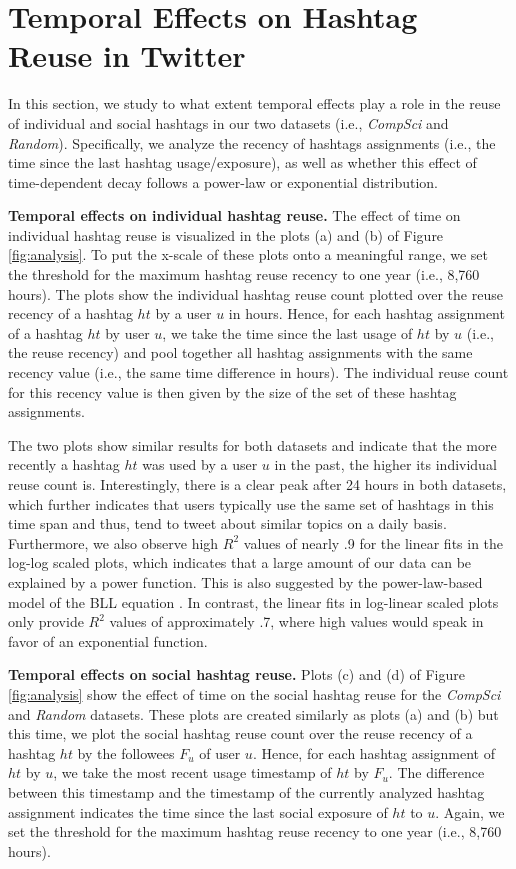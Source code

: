 \documentclass{sig-alternate-05-2015}
\newcommand{\para}[1]{\vspace{2mm}\noindent\textbf{#1}}
\begin{document}
\section{Temporal Effects on Hashtag\\Reuse in Twitter} \label{sec:analysis}
In this section, we study to what extent temporal effects play a role in the reuse of individual and social hashtags in our two datasets (i.e., \textit{CompSci}{} and \textit{Random}{}). Specifically, we analyze the recency of hashtags assignments (i.e., the time since the last hashtag usage/exposure), as well as whether this effect of time-dependent decay follows a power-law or exponential distribution.

\para{Temporal effects on individual hashtag reuse.} The effect of time on individual hashtag reuse is visualized in the plots (a) and (b) of Figure \ref{fig:analysis}. To put the x-scale of these plots onto a meaningful range, we set the threshold for the maximum hashtag reuse recency to one year (i.e., 8,760 hours). The plots show the individual hashtag reuse count plotted over the reuse recency of a hashtag $ht$ by a user $u$ in hours. Hence, for each hashtag assignment of a hashtag $ht$ by user $u$, we take the time since the last usage of $ht$ by $u$ (i.e., the reuse recency) and pool together all hashtag assignments with the same recency value (i.e., the same time difference in hours). The individual reuse count for this recency value is then given by the size of the set of these hashtag assignments.

The two plots show similar results for both datasets and indicate that the more recently a hashtag $ht$ was used by a user $u$ in the past, the higher its individual reuse count is. Interestingly, there is a clear peak after 24 hours in both datasets, which further indicates that users typically use the same set of hashtags in this time span and thus, tend to tweet about similar topics on a daily basis. Furthermore, we also observe high $R^2$ values of nearly .9 for the linear fits in the log-log scaled plots, which indicates that a large amount of our data can be explained by a power function. This is also suggested by the power-law-based model of the BLL equation \cite{anderson_reflections_1991,anderson2004integrated}. In contrast, the linear fits in log-linear scaled plots only provide $R^2$ values of approximately .7, where high values would speak in favor of an exponential function.

\para{Temporal effects on social hashtag reuse.} Plots (c) and (d) of Figure \ref{fig:analysis} show the effect of time on the social hashtag reuse for the \textit{CompSci}{} and \textit{Random}{} datasets. These plots are created similarly as plots (a) and (b) but this time, we plot the social hashtag reuse count over the reuse recency of a hashtag $ht$ by the followees $F_u$ of user $u$. Hence, for each hashtag assignment of $ht$ by $u$, we take the most recent usage timestamp of $ht$ by $F_u$. The difference between this timestamp and the timestamp of the currently analyzed hashtag assignment indicates the time since the last social exposure of $ht$ to $u$. Again, we set the threshold for the maximum hashtag reuse recency to one year (i.e., 8,760 hours).
\end{document}
